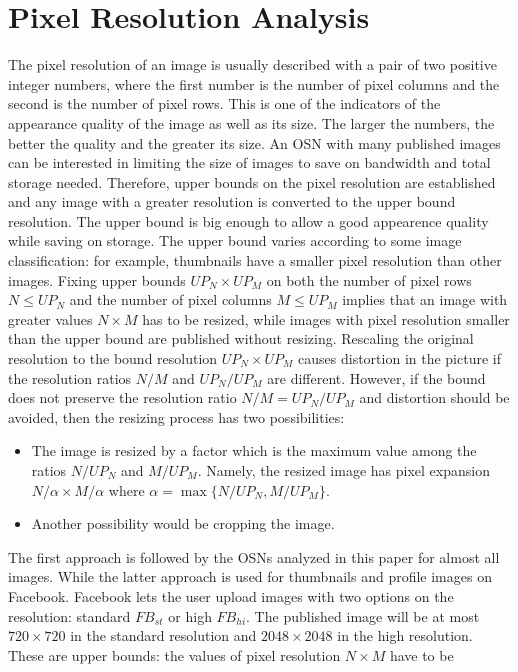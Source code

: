\documentclass[10pt, conference]{IEEEtran}
\begin{document}
\section{Pixel Resolution Analysis}
\label{sec4}
The pixel resolution of an image is usually described with a pair of two
positive integer numbers, where the first number is the number of pixel
columns and the second is the number of pixel rows.
This is one of the indicators of the appearance quality of the image as
well as its size.
The larger the numbers, the better the quality and the greater its
size. An OSN with many published images can be interested in limiting
the size of images to save on bandwidth and total storage needed. 
Therefore, upper bounds on the pixel resolution are established and any image 
with a greater resolution is converted to the upper bound resolution. The upper 
bound is big enough to allow a good appearence quality while saving on storage. 
The upper bound varies according to some image classification: for
example, thumbnails have a smaller pixel resolution than other images. 
Fixing upper bounds $UP_N\times UP_M$ on both the number of pixel rows
$N\leq UP_N$ and the number of pixel columns $M\leq UP_M$ implies that an
image with greater values $N\times M$ has to be resized, while 
images with pixel resolution smaller than the upper bound are published
without resizing.
Rescaling the original resolution to the bound resolution $UP_N\times UP_M$ 
causes distortion in the picture if the resolution ratios $N/M$ and $UP_N/UP_M$ 
are different. However, if the bound does not preserve the resolution ratio
$N/M=UP_N/UP_M$ and distortion should be avoided, then the resizing process
has two possibilities:
\begin{itemize}
\item The image is resized by a factor which is the maximum value among
the ratios $N/UP_N$ and $M/UP_M$. Namely, the resized image has pixel
expansion $N/\alpha\times M/\alpha$ where $\alpha=\max \{N/UP_N, M/UP_M\}$.
\item Another possibility would be cropping the image.
\end{itemize}
The first approach is followed by the OSNs analyzed in this paper for
almost all images. While the latter approach is used for thumbnails and profile images on
Facebook.
Facebook lets the user upload images with two options on the resolution:
standard $FB_{st}$ or high $FB_{hi}$. The published image will be at most $720\times 720$ in
the standard resolution and $2048\times 2048$ in the high resolution. These
are upper bounds: the values of pixel resolution $N\times M$ have to be
\end{document}
